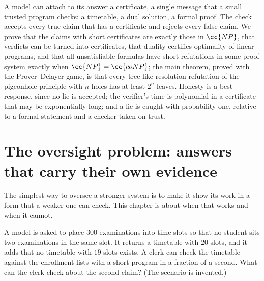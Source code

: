 \newcommand{\certificatesPHP}[2]{\mathrm{PHP}^{#1}_{#2}}
\newcommand{\certificatesSAT}{\mathrm{SAT}}
\newcommand{\certificatesUNSAT}{\mathrm{UNSAT}}
\newcommand{\certificateslv}{\operatorname{lv}}
\newcommand{\certificatesscript}[1]{\texttt{01-certificates-\allowbreak#1.py}}

\begin{refsection}

\begin{chaptersummary}
A model can attach to its answer a certificate, a single message that a small trusted program checks: a timetable, a dual solution, a formal proof. The check accepts every true claim that has a certificate and rejects every false claim. We prove that the claims with short certificates are exactly those in $\cc{NP}$, that verdicts can be turned into certificates, that duality certifies optimality of linear programs, and that all unsatisfiable formulas have short refutations in some proof system exactly when $\cc{NP}=\cc{coNP}$; the main theorem, proved with the Prover--Delayer game, is that every tree-like resolution refutation of the pigeonhole principle with $n$ holes has at least $2^n$ leaves. Honesty is a best response, since no lie is accepted; the verifier's time is polynomial in a certificate that may be exponentially long; and a lie is caught with probability one, relative to a formal statement and a checker taken on trust.
\end{chaptersummary}

\section{The oversight problem: answers that carry their own evidence}\label{sec:certificates:problem}

The simplest way to oversee a stronger system is to make it show its work in a form that a weaker one can check. This chapter is about when that works and when it cannot.

\begin{oversight}
A model is asked to place $300$ examinations into time slots so that no student sits two examinations in the same slot. It returns a timetable with $20$ slots, and it adds that no timetable with $19$ slots exists. A clerk can check the timetable against the enrollment lists with a short program in a fraction of a second. What can the clerk check about the second claim? (The scenario is invented.)
\end{oversight}


\end{refsection}
